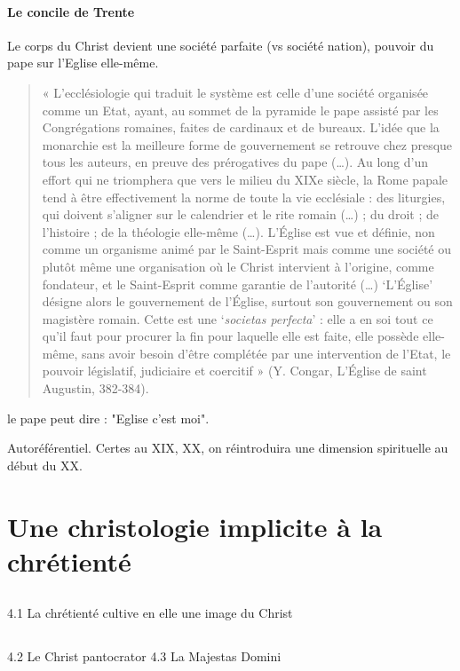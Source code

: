 \paragraph{Le concile de Trente} 

Le corps du Christ devient une société parfaite (vs société nation), pouvoir du pape sur l'Eglise elle-même.

\begin{quote}
    « L’ecclésiologie qui traduit le système est celle d’une société organisée comme un Etat,
ayant, au sommet de la pyramide le pape assisté par les Congrégations romaines, faites de
cardinaux et de bureaux. L’idée que la monarchie est la meilleure forme de gouvernement se
retrouve chez presque tous les auteurs, en preuve des prérogatives du pape (…). Au long d’un
effort qui ne triomphera que vers le milieu du XIXe siècle, la Rome papale tend à être
effectivement la norme de toute la vie ecclésiale : des liturgies, qui doivent s’aligner sur le
calendrier et le rite romain (…) ; du droit ; de l’histoire ; de la théologie elle-même (…).
L’Église est vue et définie, non comme un organisme animé par le Saint-Esprit mais comme
une société ou plutôt même une organisation où le Christ intervient à l’origine, comme
fondateur, et le Saint-Esprit comme garantie de l’autorité (…) ‘L’Église’ désigne alors le
gouvernement de l’Église, surtout son gouvernement ou son magistère romain. Cette est une
‘\textit{societas perfecta}’ : elle a en soi tout ce qu’il faut pour procurer la fin pour laquelle elle est
faite, elle possède elle-même, sans avoir besoin d’être complétée par une intervention de
l’Etat, le pouvoir législatif, judiciaire et coercitif » (Y. Congar, L’Église de saint Augustin,
382-384).
\end{quote}


le pape peut dire : "Eglise c'est moi".

Autoréférentiel.
Certes au XIX, XX, on réintroduira une dimension spirituelle au début du XX.

\section{Une christologie implicite à la chrétienté } 


\subsection{}4.1 La chrétienté cultive en elle une image du Christ


\subsection{}4.2 Le Christ pantocrator 4.3 La Majestas Domini


